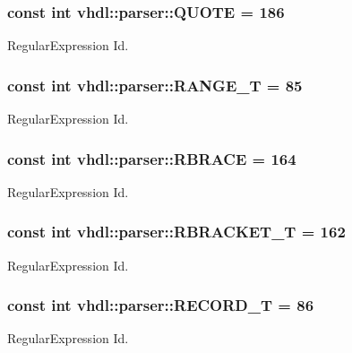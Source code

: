 \subsubsection[{Q\+U\+O\+T\+E}]{\setlength{\rightskip}{0pt plus 5cm}const int vhdl\+::parser\+::\+Q\+U\+O\+T\+E = 186}\label{namespacevhdl_1_1parser_ae266e91656cd2dcaf9fd6eb304e2d69e}
Regular\+Expression Id. \hypertarget{namespacevhdl_1_1parser_a332da138c2cfcbd27e226dd919e630ae}{}
\subsubsection[{R\+A\+N\+G\+E\+\_\+\+T}]{\setlength{\rightskip}{0pt plus 5cm}const int vhdl\+::parser\+::\+R\+A\+N\+G\+E\+\_\+\+T = 85}\label{namespacevhdl_1_1parser_a332da138c2cfcbd27e226dd919e630ae}
Regular\+Expression Id. \hypertarget{namespacevhdl_1_1parser_acb71605fea6c1791753fbbea24761b8a}{}
\subsubsection[{R\+B\+R\+A\+C\+E}]{\setlength{\rightskip}{0pt plus 5cm}const int vhdl\+::parser\+::\+R\+B\+R\+A\+C\+E = 164}\label{namespacevhdl_1_1parser_acb71605fea6c1791753fbbea24761b8a}
Regular\+Expression Id. \hypertarget{namespacevhdl_1_1parser_af4e6809997d7e0f5b7d92b3b5b843485}{}
\subsubsection[{R\+B\+R\+A\+C\+K\+E\+T\+\_\+\+T}]{\setlength{\rightskip}{0pt plus 5cm}const int vhdl\+::parser\+::\+R\+B\+R\+A\+C\+K\+E\+T\+\_\+\+T = 162}\label{namespacevhdl_1_1parser_af4e6809997d7e0f5b7d92b3b5b843485}
Regular\+Expression Id. \hypertarget{namespacevhdl_1_1parser_a9619e7dd56c9500b444ab16eb2043ff1}{}
\subsubsection[{R\+E\+C\+O\+R\+D\+\_\+\+T}]{\setlength{\rightskip}{0pt plus 5cm}const int vhdl\+::parser\+::\+R\+E\+C\+O\+R\+D\+\_\+\+T = 86}\label{namespacevhdl_1_1parser_a9619e7dd56c9500b444ab16eb2043ff1}
Regular\+Expression Id. \hypertarget{namespacevhdl_1_1parser_a507f476823f39b88e87735c164aac313}{}
